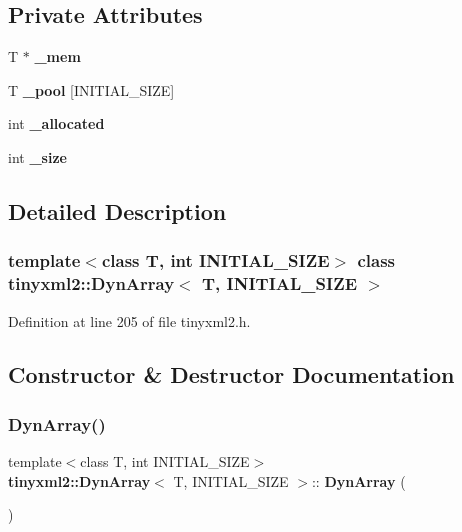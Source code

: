 \subsection*{Private Attributes}
\begin{DoxyCompactItemize}
\item 
T $\ast$ \textbf{ \+\_\+mem}
\item 
T \textbf{ \+\_\+pool} [I\+N\+I\+T\+I\+A\+L\+\_\+\+S\+I\+ZE]
\item 
int \textbf{ \+\_\+allocated}
\item 
int \textbf{ \+\_\+size}
\end{DoxyCompactItemize}


\subsection{Detailed Description}
\subsubsection*{template$<$class T, int I\+N\+I\+T\+I\+A\+L\+\_\+\+S\+I\+ZE$>$\newline
class tinyxml2\+::\+Dyn\+Array$<$ T, I\+N\+I\+T\+I\+A\+L\+\_\+\+S\+I\+Z\+E $>$}



Definition at line 205 of file tinyxml2.\+h.



\subsection{Constructor \& Destructor Documentation}
\mbox{\label{classtinyxml2_1_1_dyn_array_aaad72f384e761c70a4519183eb8fea17}} 
\subsubsection{Dyn\+Array()\hspace{0.1cm}{\footnotesize\ttfamily [1/2]}}
{\footnotesize\ttfamily template$<$class T, int I\+N\+I\+T\+I\+A\+L\+\_\+\+S\+I\+ZE$>$ \\
\textbf{ tinyxml2\+::\+Dyn\+Array}$<$ T, I\+N\+I\+T\+I\+A\+L\+\_\+\+S\+I\+ZE $>$\+::\textbf{ Dyn\+Array} (\begin{DoxyParamCaption}{ }\end{DoxyParamCaption})\hspace{0.3cm}{\ttfamily [inline]}}



